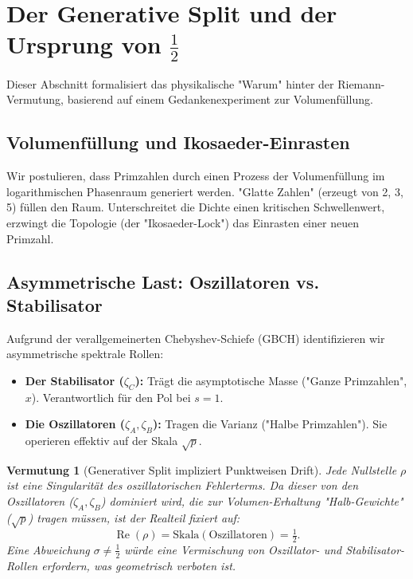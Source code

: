 \documentclass[11pt]{article}
\newtheorem{conjecture}{Vermutung}
\newcommand{\Rea}{\operatorname{Re}}
\newcommand{\zA}{\zeta_A}
\newcommand{\zB}{\zeta_B}
\newcommand{\zC}{\zeta_C}
\begin{document}
\section{Der Generative Split und der Ursprung von $\tfrac12$}

Dieser Abschnitt formalisiert das physikalische "Warum" hinter der Riemann-Vermutung, basierend auf einem Gedankenexperiment zur Volumenfüllung.

\subsection{Volumenfüllung und Ikosaeder-Einrasten}
Wir postulieren, dass Primzahlen durch einen Prozess der Volumenfüllung im logarithmischen Phasenraum generiert werden. "Glatte Zahlen" (erzeugt von 2, 3, 5) füllen den Raum. Unterschreitet die Dichte einen kritischen Schwellenwert, erzwingt die Topologie (der "Ikosaeder-Lock") das Einrasten einer neuen Primzahl.

\subsection{Asymmetrische Last: Oszillatoren vs. Stabilisator}
Aufgrund der verallgemeinerten Chebyshev-Schiefe (GBCH) identifizieren wir asymmetrische spektrale Rollen:
\begin{itemize}
\item \textbf{Der Stabilisator ($\zC$):} Trägt die asymptotische Masse ("Ganze Primzahlen", $x$). Verantwortlich für den Pol bei $s=1$.
\item \textbf{Die Oszillatoren ($\zA,\zB$):} Tragen die Varianz ("Halbe Primzahlen"). Sie operieren effektiv auf der Skala $\sqrt{p}$.
\end{itemize}

\begin{conjecture}[Generativer Split impliziert Punktweisen Drift]\label{conj:split}
Jede Nullstelle $\rho$ ist eine Singularität des oszillatorischen Fehlerterms. Da dieser von den Oszillatoren ($\zA, \zB$) dominiert wird, die zur Volumen-Erhaltung "Halb-Gewichte" ($\sqrt{p}$) tragen müssen, ist der Realteil fixiert auf:
\[
\Rea(\rho) = \text{Skala}(\text{Oszillatoren}) = \tfrac12.
\]
Eine Abweichung $\sigma \neq \tfrac12$ würde eine Vermischung von Oszillator- und Stabilisator-Rollen erfordern, was geometrisch verboten ist.
\end{conjecture}

\end{document}
